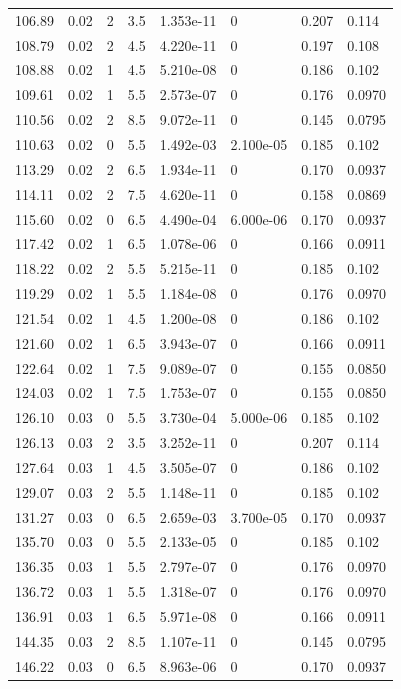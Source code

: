 \documentclass[preview]{standalone}
\begin{document}
{{{\begin{tabular}{L{1.2cm}C{1.2cm} C{0.3cm}C{0.5cm} C{1.4cm}C{1.4cm} C{1.4cm}C{1.4cm}}
  106.89  &  0.02  & 2     & 3.5 &  1.353e-11  & 0  & 0.207 &  0.114   \\ 
  108.79  &  0.02  & 2     & 4.5 &  4.220e-11  & 0  & 0.197 &  0.108   \\ 
  108.88  &  0.02  & 1     & 4.5 &  5.210e-08  & 0  & 0.186 &  0.102   \\ 
  109.61  &  0.02  & 1     & 5.5 &  2.573e-07  & 0  & 0.176 &  0.0970   \\ 
  110.56  &  0.02  & 2     & 8.5 &  9.072e-11  & 0  & 0.145 &  0.0795   \\ 
  110.63  &  0.02  & 0     & 5.5 &  1.492e-03  & 2.100e-05  & 0.185 &  0.102   \\ 
  113.29  &  0.02  & 2     & 6.5 &  1.934e-11  & 0  & 0.170 &  0.0937   \\ 
  114.11  &  0.02  & 2     & 7.5 &  4.620e-11  & 0  & 0.158 &  0.0869   \\ 
  115.60  &  0.02  & 0     & 6.5 &  4.490e-04  & 6.000e-06  & 0.170 &  0.0937   \\ 
  117.42  &  0.02  & 1     & 6.5 &  1.078e-06  & 0  & 0.166 &  0.0911   \\ 
  118.22  &  0.02  & 2     & 5.5 &  5.215e-11  & 0  & 0.185 &  0.102   \\ 
  119.29  &  0.02  & 1     & 5.5 &  1.184e-08  & 0  & 0.176 &  0.0970   \\ 
  121.54  &  0.02  & 1     & 4.5 &  1.200e-08  & 0  & 0.186 &  0.102   \\ 
  121.60  &  0.02  & 1     & 6.5 &  3.943e-07  & 0  & 0.166 &  0.0911   \\ 
  122.64  &  0.02  & 1     & 7.5 &  9.089e-07  & 0  & 0.155 &  0.0850   \\ 
  124.03  &  0.02  & 1     & 7.5 &  1.753e-07  & 0  & 0.155 &  0.0850   \\ 
  126.10  &  0.03  & 0     & 5.5 &  3.730e-04  & 5.000e-06  & 0.185 &  0.102   \\ 
  126.13  &  0.03  & 2     & 3.5 &  3.252e-11  & 0  & 0.207 &  0.114   \\ 
  127.64  &  0.03  & 1     & 4.5 &  3.505e-07  & 0  & 0.186 &  0.102   \\ 
  129.07  &  0.03  & 2     & 5.5 &  1.148e-11  & 0  & 0.185 &  0.102   \\ 
  131.27  &  0.03  & 0     & 6.5 &  2.659e-03  & 3.700e-05  & 0.170 &  0.0937   \\ 
  135.70  &  0.03  & 0     & 5.5 &  2.133e-05  & 0  & 0.185 &  0.102   \\ 
  136.35  &  0.03  & 1     & 5.5 &  2.797e-07  & 0  & 0.176 &  0.0970   \\ 
  136.72  &  0.03  & 1     & 5.5 &  1.318e-07  & 0  & 0.176 &  0.0970   \\ 
  136.91  &  0.03  & 1     & 6.5 &  5.971e-08  & 0  & 0.166 &  0.0911   \\ 
  144.35  &  0.03  & 2     & 8.5 &  1.107e-11  & 0  & 0.145 &  0.0795   \\ 
  146.22  &  0.03  & 0     & 6.5 &  8.963e-06  & 0  & 0.170 &  0.0937   \\ 
\hline 
\end{tabular} 

}}}
\end{document}

